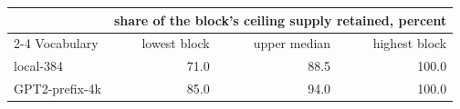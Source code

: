 \begin{tabular}{@{}lrrr@{}}
\toprule
 & \multicolumn{3}{c}{share of the block's ceiling supply retained, percent} \\
\cmidrule(lr){2-4}
Vocabulary & lowest block & upper median & highest block \\
\midrule
local-384 & 71.0 & 88.5 & 100.0 \\
GPT2-prefix-4k & 85.0 & 94.0 & 100.0 \\
\bottomrule
\end{tabular}
